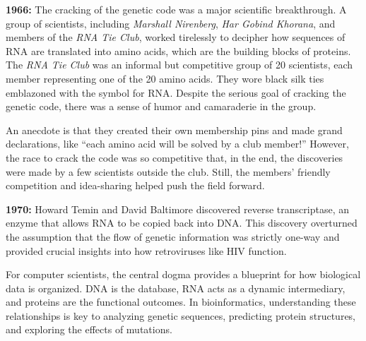 \medskip\noindent\textbf{1966:} The cracking of the genetic code was a major scientific breakthrough. A group of scientists, including \textit{Marshall Nirenberg}, \textit{Har Gobind Khorana}, and members of the \textit{RNA Tie Club}, worked tirelessly to decipher how sequences of RNA are translated into amino acids, which are the building blocks of proteins. The \textit{RNA Tie Club} was an informal but competitive group of 20 scientists, each member representing one of the 20 amino acids. They wore black silk ties emblazoned with the symbol for RNA. Despite the serious goal of cracking the genetic code, there was a sense of humor and camaraderie in the group.

An anecdote is that they created their own membership pins and made grand declarations, like ``each amino acid will be solved by a club member!'' However, the race to crack the code was so competitive that, in the end, the discoveries were made by a few scientists outside the club. Still, the members’ friendly competition and idea-sharing helped push the field forward.

\bigskip\noindent\textbf{1970:} Howard Temin and David Baltimore discovered reverse transcriptase, an enzyme that allows RNA to be copied back into DNA. This discovery overturned the assumption that the flow of genetic information was strictly one-way and provided crucial insights into how retroviruses like HIV function.

\bigskip\noindent
For computer scientists, the central dogma provides a blueprint for how biological data is organized. DNA is the database, RNA acts as a dynamic intermediary, and proteins are the functional outcomes. In bioinformatics, understanding these relationships is key to analyzing genetic sequences, predicting protein structures, and exploring the effects of mutations.